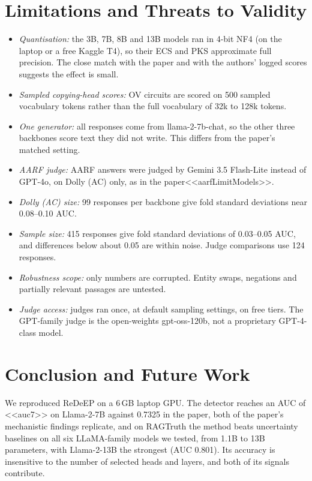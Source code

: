 \documentclass[conference]{IEEEtran}
\begin{document}
\section{Limitations and Threats to Validity}
\begin{itemize}
\item \emph{Quantisation:} the 3B, 7B, 8B and 13B models ran in 4-bit NF4 (on the laptop or a free Kaggle T4), so their ECS and PKS approximate full precision. The close match with the paper and with the authors' logged scores suggests the effect is small.
\item \emph{Sampled copying-head scores:} OV circuits are scored on 500 sampled vocabulary tokens rather than the full vocabulary of 32k to 128k tokens.
\item \emph{One generator:} all responses come from llama-2-7b-chat, so the other three backbones score text they did not write. This differs from the paper's matched setting.
\item \emph{AARF judge:} AARF answers were judged by Gemini 3.5 Flash-Lite instead of GPT-4o, on Dolly (AC) only, as in the paper<<aarfLimitModels>>.
\item \emph{Dolly (AC) size:} 99 responses per backbone give fold standard deviations near 0.08--0.10 AUC.
\item \emph{Sample size:} 415 responses give fold standard deviations of 0.03--0.05 AUC, and differences below about 0.05 are within noise. Judge comparisons use 124 responses.
\item \emph{Robustness scope:} only numbers are corrupted. Entity swaps, negations and partially relevant passages are untested.
\item \emph{Judge access:} judges ran once, at default sampling settings, on free tiers. The GPT-family judge is the open-weights gpt-oss-120b, not a proprietary GPT-4-class model.
\end{itemize}

\section{Conclusion and Future Work}
We reproduced ReDeEP on a 6\,GB laptop GPU. The detector reaches an AUC of <<auc7>> on Llama-2-7B against 0.7325 in the paper, both of the paper's mechanistic findings replicate, and on RAGTruth the method beats uncertainty baselines on all six LLaMA-family models we tested, from 1.1B to 13B parameters, with Llama-2-13B the strongest (AUC 0.801). Its accuracy is insensitive to the number of selected heads and layers, and both of its signals contribute.
\end{document}
